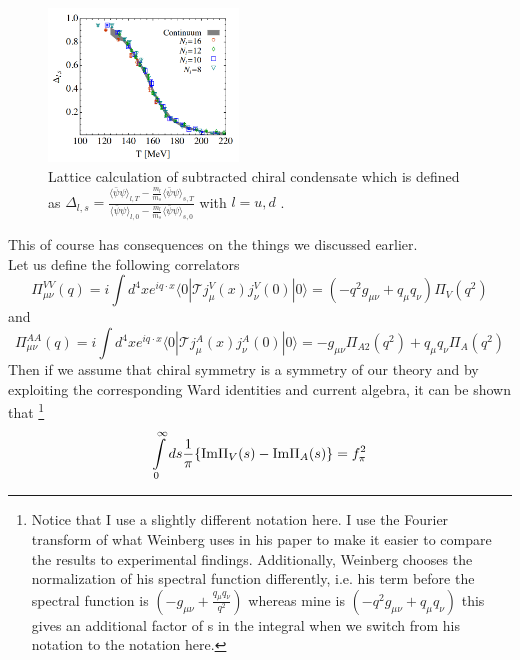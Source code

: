 \begin{figure}[b]
	\centering
	\includegraphics[width=0.45\textwidth]{Figures/ChiralOrderParameterLattice}
	\caption{Lattice calculation of subtracted chiral condensate which is defined as $ \Delta_{l,s} = \frac{\langle \bar{\psi} \psi \rangle_{l,T} - \frac{m_l}{m_s} \langle \bar{\psi} \psi \rangle_{s,T}}{\langle \bar{\psi} \psi \rangle_{l,0} - \frac{m_l}{m_s} \langle \bar{\psi} \psi \rangle_{s,0}}$ with $l = u,d$ \cite{OrdParLat}.}
	\label{fig:ordparlat}
\end{figure}
This of course has consequences on the things we discussed earlier. \\
Let us define the following correlators
\begin{equation}
\label{eqn:corV}
\Pi_{\mu\nu}^{VV} (q) = i \int d^4x e^{iq \cdot x} \langle 0 | \mathcal{T} j^V_{\mu}(x)j^V_{\nu}(0) | 0 \rangle = \left( -q^2 g_{\mu\nu} + q_{\mu}q_{\nu} \right) \Pi_V(q^2)
\end{equation}
and
\begin{equation}
\label{eqn:corA}
\Pi_{\mu\nu}^{AA} (q) = i \int d^4x e^{iq \cdot x} \langle 0 | \mathcal{T} j^A_{\mu}(x)j^A_{\nu}(0) | 0 \rangle = -g_{\mu\nu} \Pi_{A2}(q^2) + q_{\mu}q_{\nu} \Pi_A(q^2)
\end{equation}
Then if we assume that chiral symmetry is a symmetry of our theory and by exploiting the corresponding Ward identities and current algebra, it can be shown that \cite{WeinbergAVmixing}\footnote{Notice that I use a slightly different notation here. I use the Fourier transform of what Weinberg uses in his paper to make it easier to compare the results to experimental findings. Additionally, Weinberg chooses the normalization of his spectral function differently, i.e. his term before the spectral function is $\left( -g_{\mu\nu} + \frac{q_{\mu}q_{\nu}}{q^2} \right)$ whereas mine is $\left( -q^2 g_{\mu\nu} + q_{\mu}q_{\nu} \right)$ this gives an additional factor of s in the integral when we switch from his notation to the notation here.}
\begin{equation}
\int\limits_0^{\infty} ds \frac{1}{\pi} \lbrace \mathrm{Im}\Pi_V(s) - \mathrm{Im}\Pi_A(s) \rbrace = f_{\pi}^2
\end{equation} 
